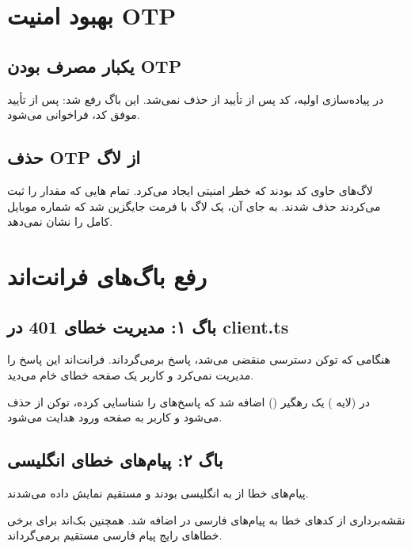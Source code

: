 \documentclass[12pt, a4paper]{article}
\begin{document}
\newpage

\section{بهبود امنیت OTP}

\subsection{یکبار مصرف بودن OTP}
در پیاده‌سازی اولیه، کد  پس از تأیید از  حذف نمی‌شد.
این باگ رفع شد: پس از تأیید موفق کد،  فراخوانی می‌شود.

\subsection{حذف OTP از لاگ}
لاگ‌های  حاوی کد  بودند که خطر امنیتی ایجاد می‌کرد.
تمام هایی که مقدار  را ثبت می‌کردند حذف شدند.
به جای آن، یک لاگ با فرمت \texttt{} جایگزین شد که
شماره موبایل کامل را نشان نمی‌دهد.

\newpage

\section{رفع باگ‌های فرانت‌اند}

\subsection{باگ ۱: مدیریت خطای 401 در client.ts}
\begin{description}[rightmargin=0.5cm]
  \item[مشکل:] هنگامی که توکن دسترسی منقضی می‌شد،  پاسخ  برمی‌گرداند.
    فرانت‌اند این پاسخ را مدیریت نمی‌کرد و کاربر یک صفحه خطای خام می‌دید.
  \item[راه‌حل:] در  (لایه ) یک رهگیر () اضافه شد
    که پاسخ‌های  را شناسایی کرده، توکن از  حذف می‌شود و
    کاربر به صفحه ورود هدایت می‌شود.
\end{description}

\subsection{باگ ۲: پیام‌های خطای انگلیسی}
\begin{description}[rightmargin=0.5cm]
  \item[مشکل:] پیام‌های خطا از  به انگلیسی بودند و مستقیم نمایش داده می‌شدند.
  \item[راه‌حل:] نقشه‌برداری از کدهای خطا به پیام‌های فارسی در  اضافه شد.
    همچنین بک‌اند برای برخی خطاهای رایج پیام فارسی مستقیم برمی‌گرداند.
\end{description}
\end{document}
